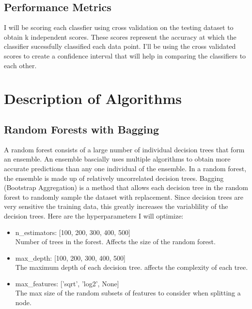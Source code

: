 \documentclass[12pt]{article}
\begin{document}
\subsection{Performance Metrics}
I will be scoring each classfier using cross validation on the testing dataset to obtain k independent scores. These scores represent the accuracy at which the classifier sucessfully classified each data point. I'll be using the cross validated scores to create a confidence interval that will help in comparing the classifiers to each other.

\section{Description of Algorithms}
\subsection{Random Forests with Bagging}
A random forest consists of a large number of individual decision trees that form an ensemble. An ensemble bascially uses multiple algorithms to obtain more accurate predictions than any one individual of the ensemble. In a random forest, the ensemble is made up of relatively uncorrelated decision trees. Bagging (Bootstrap Aggregation) is a method that allows each decision tree in the random forest to randomly sample the dataset with replacement. Since decision trees are very sensitive the training data, this greatly increases the variablility of the decision trees. Here are the hyperparameters I will optimize:
\begin{itemize}
    \item n\_estimators: [100, 200, 300, 400, 500]
    \\ Number of trees in the forest. Affects the size of the random forest.
    \item max\_depth: [100, 200, 300, 400, 500]
    \\ The maximum depth of each decision tree. affects the complexity of each tree.
    \item max\_features: ['sqrt', 'log2', None]
    \\ The max size of the random subsets of features to consider when splitting a node.
\end{itemize}
\end{document}
